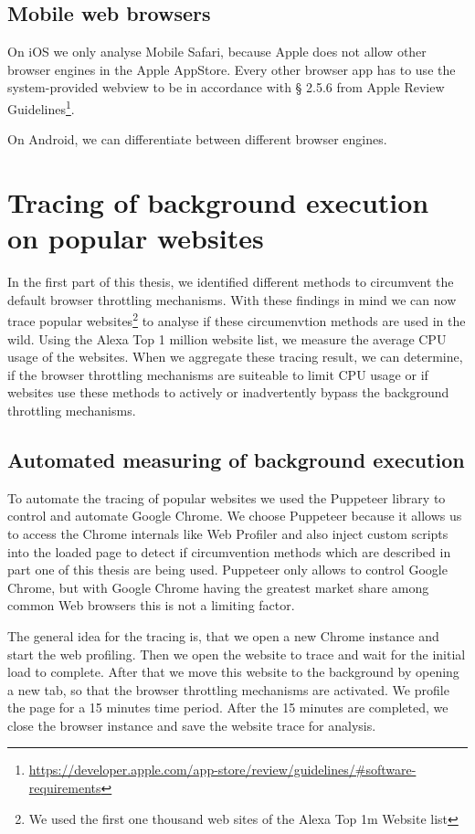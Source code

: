 \documentclass[article,type=bsc,colorback,accentcolor=tud9c]{tudthesis}
\begin{document}
  \subsection{Mobile web browsers}

  On iOS we only analyse Mobile Safari, because Apple does not allow other browser engines in the Apple AppStore. Every other browser app has to use the system-provided webview to be in accordance with § 2.5.6 from Apple Review Guidelines\footnote{\url{https://developer.apple.com/app-store/review/guidelines/\#software-requirements}}.

  On Android, we can differentiate between different browser engines.


  \newpage
  \section{Tracing of background execution on popular websites}

  In the first part of this thesis, we identified different methods to circumvent the default browser throttling mechanisms. With these findings in mind we can now trace popular websites\footnote{We used the first one thousand web sites of the Alexa Top 1m Website list} to analyse if these circumenvtion methods are used in the wild. Using the Alexa Top 1 million website list, we measure the average CPU usage of the websites. When we aggregate these tracing result, we can determine, if the browser throttling mechanisms are suiteable to limit CPU usage or if websites use these methods to actively or inadvertently bypass the background throttling mechanisms.
  
  \subsection{Automated measuring of background execution}

  To automate the tracing of popular websites we used the Puppeteer\cite{pptr} library to control and automate Google Chrome. We choose Puppeteer because it allows us to access the Chrome internals like Web Profiler and also inject custom scripts into the loaded page to detect if circumvention methods which are described in part one of this thesis are being used. Puppeteer only allows to control Google Chrome, but with Google Chrome having the greatest market share among common Web browsers this is not a limiting factor.

  The general idea for the tracing is, that we open a new Chrome instance and start the web profiling. Then we open the website to trace and wait for the initial load to complete. After that we move this website to the background by opening a new tab, so that the browser throttling mechanisms are activated. We profile the page for a 15 minutes time period. After the 15 minutes are completed, we close the browser instance and save the website trace for analysis.
\end{document}
